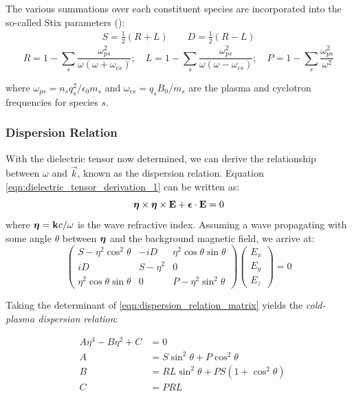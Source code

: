 The various summations over each constituent species are incorporated into the so-called Stix parameters (\cite{Stix1992}):
\begin{eqnarray}
S =\frac{1}{2}(R + L) \qquad D = \frac{1}{2}(R - L)
\label{eqn:stix_params_1}
\end{eqnarray}
\begin{equation}
R = 1 - \sum_s\frac{\omega_{ps}^2}{\omega(\omega + \omega_{cs})}; \quad L = 1 - \sum_s\frac{\omega_{ps}^2}{\omega(\omega - \omega_{cs})}; \quad P = 1 - \sum_s\frac{\omega_{ps}^2}{\omega^2}
\label{eqn:stix_params_2}
\end{equation}

where $\omega_{ps} = n_sq_s^2/{\epsilon_0 m_s}$ and $\omega_{cs}=q_sB_0/m_s$ are the plasma and cyclotron frequencies for species $s$.

\subsubsection{Dispersion Relation}
With the dielectric tensor now determined, we can derive the relationship between $\omega$ and $\vec{k}$, known as the dispersion relation. Equation \eqref{eqn:dielectric_tensor_derivation_1} can be written as:
\begin{equation}
\boldsymbol{\eta}\times \boldsymbol{\eta} \times \mathbf{E} +  \boldsymbol{\epsilon}\cdot\mathbf{E} = 0
\end{equation}
where $\boldsymbol{\eta} = \mathbf{k}c/\omega$ is the wave refractive index. Assuming a wave propagating with some angle $\theta$ between $\boldsymbol{\eta}$ and the background magnetic field, we arrive at:
\begin{equation}
\begin{pmatrix}
S - \eta^2\cos^2\theta & -iD & \eta^2\cos{\theta}\sin{\theta} \\
iD & S - \eta^2 & 0 \\
\eta^2\cos{\theta}\sin{\theta} & 0 & P - \eta^2\sin^2{\theta} \end{pmatrix}\begin{pmatrix}E_x \\ E_y \\ E_z\end{pmatrix} = 0
\label{eqn:dispersion_relation_matrix}
\end{equation}

Taking the determinant of \ref{eqn:dispersion_relation_matrix} yields the \emph{cold-plasma dispersion relation}:

\begin{eqnarray}
&A\eta^4 - B\eta^2 + C &= 0 \label{eqn:disp_rln}  \\
&A& = S \sin^2\theta + P\cos^2\theta \\
&B& = RL\sin^2\theta + PS(1 + \cos^2\theta) \\
&C& = PRL
\end{eqnarray}

